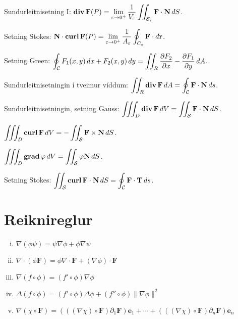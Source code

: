 Sundurleitnisetning I: 
$\displaystyle \mbox{${\rm\bf div\,}$}\mbox{${\bf F}$}(P)=\lim_{\varepsilon\rightarrow 0^+}
\frac{1}{V_\varepsilon}\int\!\!\!\int_{{\cal S}_\varepsilon}\mbox{${\bf F}$}\cdot\mbox{${\bf N}$}\,dS$.

Setning Stokes: 
$\displaystyle \mbox{${\bf N}$}\cdot\mbox{${\rm\bf curl\,}$}\mbox{${\bf F}$}(P)=\lim_{\varepsilon\rightarrow 0^+}
\frac{1}{A_\varepsilon}\oint_{C_\varepsilon}\mbox{${\bf F}$}\cdot d\mbox{${\bf r}$}$.

Setning Green: 
$\displaystyle \oint_{\cal C}F_1(x,y)\,dx+F_2(x,y)\,dy=\int\!\!\!\int_R
\frac{\partial  F_2}{\partial x}-
\frac{\partial  F_1}{\partial y}\,dA$.

Sundurleitnisetningin í tveimur víddum: 
$\displaystyle \int\!\!\!\int_R\mbox{${\rm\bf div\,}$}\mbox{${\bf F}$}\,dA=\oint_{\cal C} \mbox{${\bf F}$}\cdot\mbox{${\bf N}$}\,ds$.

Sundurleitnisetningin, setning Gauss: 
$\displaystyle \int\!\!\!\int\!\!\!\int_D \mbox{${\rm\bf div\,}$}\mbox{${\bf F}$}\,dV=\int\!\!\!\int_{\cal S} \mbox{${\bf F}$}\cdot\mbox{${\bf N}$}\,dS$. 

$\displaystyle \int\!\!\!\int\!\!\!\int_D\mbox{${\rm\bf curl\,}$}\mbox{${\bf F}$}\,dV=-\int\!\!\!\int_{\cal S}\mbox{${\bf F}$}\times\mbox{${\bf N}$}\,dS$.

$\displaystyle \int\!\!\!\int\!\!\!\int_D\mbox{${\rm\bf grad\,}$}\varphi\,dV=\int\!\!\!\int_{\cal S}\varphi\mbox{${\bf N}$}\,dS$.


Setning Stokes: 
$\displaystyle \int\!\!\!\int_{\cal S} \mbox{${\rm\bf curl\,}$}\mbox{${\bf F}$}\cdot\mbox{${\bf N}$}\,dS=\oint_{\cal C}\mbox{${\bf F}$}\cdot \mbox{${\bf T}$}\,ds$.

\newpage

\section*{Reiknireglur}
\begin{enumerate}[(i)]
	\item $\nabla(\phi\psi) = \psi\nabla \phi + \phi \nabla\psi$
	\item $\nabla \cdot (\phi \mathbf F) = \phi \nabla \cdot \mathbf F 
		+(\nabla \phi)\cdot \mathbf F$
	\item $\nabla(f\circ \phi) = (f'\circ \phi)\nabla \phi$
	\item $\Delta(f\circ \phi) = (f'\circ \phi)\Delta \phi + 
		(f''\circ \phi)\|\nabla \phi\|^2$
	\item $\nabla(\chi \circ \mathbf F) = (((\nabla \chi)\circ \mathbf F)
		\partial_1\mathbf F) \mathbf e_1 + \cdots
		+ (((\nabla \chi)\circ \mathbf F)\partial _n \mathbf F)
		\mathbf e_n$
\end{enumerate}


